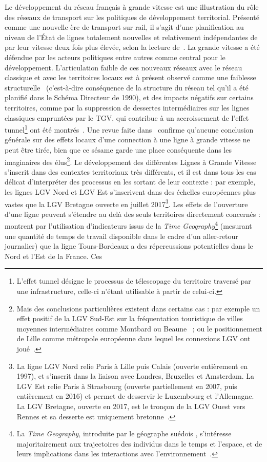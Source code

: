 {}{
Le développement du réseau français à grande vitesse est une illustration du rôle des réseaux de transport sur les politiques de développement territorial. Présenté comme une nouvelle ère de transport sur rail, il s'agit d'une planification au niveau de l'État de lignes totalement nouvelles et relativement indépendantes de par leur vitesse deux fois plus élevée, selon la lecture de~\cite{zembri1997fondements}. La grande vitesse a été défendue par les acteurs politiques entre autres comme central pour le développement. L'articulation faible de ces nouveaux réseaux avec le réseau classique et avec les territoires locaux est à présent observé comme une faiblesse structurelle~\cite{zembri1997fondements} (c'est-à-dire conséquence de la structure du réseau tel qu'il a été planifié dans le Schéma Directeur de 1990), et des impacts négatifs sur certains territoires, comme par la suppression de dessertes intermédiaires sur les lignes classiques empruntées par le TGV, qui contribue à un accroissement de l'effet tunnel\footnote{L'effet tunnel désigne le processus de télescopage du territoire traversé par une infrastructure, celle-ci n'étant utilisable à partir de celui-ci.} ont été montrés~\cite{zembri2008contribution}. Une revue faite dans~\cite{bazin2011grande} confirme qu'aucune conclusion générale sur des effets locaux d'une connection à une ligne à grande vitesse ne peut être tirée, bien que ce sésame garde une place conséquente dans les imaginaires des élus\footnote{Mais des conclusions particulières existent dans certains cas : par exemple un effet positif de la LGV Sud-Est sur la fréquentation touristique de villes moyennes intermédiaires comme Montbard ou Beaune~\cite{bonnafous1987regional} ; ou le positionnement de Lille comme métropole européenne dans lequel les connexions LGV ont joué~\cite{giblin2004lille}.}. Le développement des différentes Lignes à Grande Vitesse s'inscrit dans des contextes territoriaux très différents, et il est dans tous les cas délicat d'interpréter des processus en les sortant de leur contexte : par exemple, les lignes LGV Nord et LGV Est s'inscrivent dans des échelles européennes plus vastes que la LGV Bretagne ouverte en juillet 2017\footnote{La ligne LGV Nord relie Paris à Lille puis Calais (ouverte entièrement en 1997), et s'inscrit dans la liaison avec Londres, Bruxelles et Amsterdam. La LGV Est relie Paris à Strasbourg (ouverte partiellement en 2007, puis entièrement en 2016) et permet de desservir le Luxembourg et l'Allemagne. La LGV Bretagne, ouverte en 2017, est le tronçon de la LGV Ouest vers Rennes et sa desserte est uniquement bretonne~\cite{zembri2010new}.}. Les effets de l'ouverture d'une ligne peuvent s'étendre au delà des seuls territoires directement concernés : \cite{l2014contribution} montrent par l'utilisation d'indicateurs issus de la \emph{Time Geography}\footnote{La \emph{Time Geography}, introduite par le géographe suédois , s'intéresse majoritairement aux trajectoires des individus dans le temps et l'espace, et de leurs implications dans les interactions avec l'environnement~\cite{chardonnel2007time}.} (mesurant une quantité de temps de travail disponible dans le cadre d'un aller-retour journalier) que la ligne Tours-Bordeaux a des répercussions potentielles dans le Nord et l'Est de la France. Ces }
